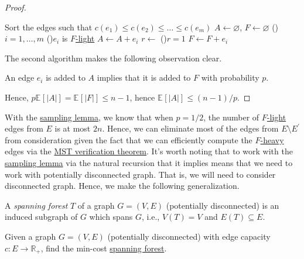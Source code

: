 \begin{proof}
\begin{algorithm}[H]
		Sort the edges such that \(c(e_1) \leq c(e_2) \leq \dots \leq c(e_m)\)\;
		\(A \gets \varnothing \), \(F \gets \varnothing \)\;
		\For(){\(i = 1, \dots , m\)}{
			\If(){\(e_i\) is \hyperref[def:light]{\(F\)-light}}{
				\(A \gets A + e_i\)\;
				\(r \gets\)
				\If(){\(r = 1\)}{
					\(F \gets F + e_i\)\;
				}
			}
		}
		\;
	\end{algorithm}

	The second algorithm makes the following observation clear.

	\begin{intuition}
		An edge \(e_i\) is added to \(A\) implies that it is added to \(F\) with probability \(p\).
	\end{intuition}

	Hence, \(p \mathbb{E}_{}[\lvert A \rvert ] = \mathbb{E}_{}[\lvert F \rvert ] \leq n - 1\), hence \(\mathbb{E}_{}[\lvert A \rvert ] \leq (n - 1) / p\).
\end{proof}

With the \hyperref[lma:sampling]{sampling lemma}, we know that when \(p = 1 / 2\), the number of \hyperref[def:light]{\(F\)-light} edges from \(E\) is at most \(2n\). Hence, we can eliminate most of the edges from \(E \setminus E^{\prime} \) from consideration given the fact that we can efficiently compute the \hyperref[def:heavy]{\(F\)-heavy} edges via the \hyperref[thm:MST-verification]{MST verification theorem}. It's worth noting that to work with the \hyperref[lma:sampling]{sampling lemma} via the natural recursion that it implies means that we need to work with potentially disconnected graph. That is, we will need to consider disconnected graph. Hence, we make the following generalization.

\begin{definition}\label{def:spanning-forest}
	A \emph{spanning forest} \(T\) of a graph \(G =(V, E)\) (potentially disconnected) is an induced subgraph of \(G\) which spans \(G\), i.e., \(V(T) = V\) and \(E(T) \subseteq E\).
\end{definition}

\begin{problem}\label{prb:MSF}
Given a graph \(G=(V, E)\) (potentially disconnected) with edge capacity \(c \colon E \to \mathbb{R} _+ \), find the min-cost \hyperref[def:spanning-forest]{spanning forest}.
\end{problem}

